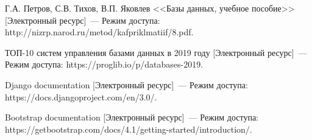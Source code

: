 
\begin{thebibliography}{9} 
    
     Г.А. Петров, С.В. Тихов, В.П. Яковлев <<Базы данных, учебное пособие>> [Электронный ресурс]~--- Режим доступа: {http://nizrp.narod.ru/metod/kafpriklmatiif/8.pdf}.
    
     ТОП-10 систем управления базами данных в 2019 году [Электронный ресурс]~--- Режим доступа: {https://proglib.io/p/databases-2019}.
    
     Django documentation [Электронный ресурс]~--- Режим доступа: {https://docs.djangoproject.com/en/3.0/}.
    
     Bootstrap documentation [Электронный ресурс]~--- Режим доступа: {https://getbootstrap.com/docs/4.1/getting-started/introduction/}.
    
\end{thebibliography}
